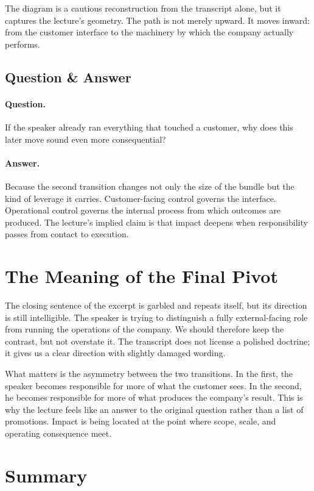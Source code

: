 The diagram is a cautious reconstruction from the transcript alone, but it captures the lecture's geometry. The path is not merely upward. It moves inward: from the customer interface to the machinery by which the company actually performs.

\subsection{Question \& Answer}

\paragraph{Question.}
If the speaker already ran everything that touched a customer, why does this later move sound even more consequential?

\paragraph{Answer.}
Because the second transition changes not only the size of the bundle but the kind of leverage it carries. Customer-facing control governs the interface. Operational control governs the internal process from which outcomes are produced. The lecture's implied claim is that impact deepens when responsibility passes from contact to execution.

\section{The Meaning of the Final Pivot}

The closing sentence of the excerpt is garbled and repeats itself, but its direction is still intelligible. The speaker is trying to distinguish a fully external-facing role from running the operations of the company. We should therefore keep the contrast, but not overstate it. The transcript does not license a polished doctrine; it gives us a clear direction with slightly damaged wording.

What matters is the asymmetry between the two transitions. In the first, the speaker becomes responsible for more of what the customer sees. In the second, he becomes responsible for more of what produces the company's result. This is why the lecture feels like an answer to the original question rather than a list of promotions. Impact is being located at the point where scope, scale, and operating consequence meet.

\section{Summary}

